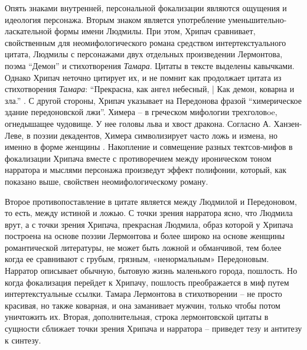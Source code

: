 \documentclass[12pt,a4paper]{article}
\begin{document}
Опять знаками внутренней, персональной фокализации являются ощущения и идеология персонажа. Вторым знаком является употребление уменьшительно-ласкательной формы имени Людмилы.  При этом, Хрипач сравнивает, свойственным для неомифологического романа средством интертекстуального цитата, Людмилы с персонажами двух отдельных произведении Лермонтова, поэма \enquote{Демон} и стихотворения \emph{Тамара}. Цитаты в тексте выделены кавычками. Однако Хрипач неточно цитирует их, и не помнит как продолжает цитата из стихотворения \emph{Тамара}: \enquote{Прекрасна, как ангел небесный, | Как демон, коварна и зла.} \parencite[194]{lermontov2000}. С другой стороны, Хрипач указывает на Передонова фразой \enquote{химерическое здание передоновской лжи}. Химера – в греческом мифологии трехголовoe, огнедышащее чудовище. У нее головы льва и хвост дракона. Согласно А. Ханзен-Леве, в поэзии декадентов, Химера символизирует часто ложь и измена, но именно в форме женщины \parencite[200]{hansen-love1999}. Накопление и совмещение разных тектсов-мифов в фокализации Хрипача вместе с противоречием между ироническом тоном нарратора и мыслями персонажа произведут эффект полифонии, который, как показано выше, свойствен неомифологическому роману.

Второе противопоставление в цитате является между Людмилой и Передоновом, то есть, между истиной и ложью. С точки зрения нарратора ясно, что Людмила врут, а с точки зрения Хрипача, прекрасная Людмила, образ которой у Хрипача построена на основе поэзии Лермонтова и более широко на основе женщины романтической литературы, не может быть ложной и обманчивой, тем более когда ее сравнивают с грубым, грязным, «ненормальным» Передоновым. Нарратор описывает обычную, бытовую жизнь маленького города, пошлость. Но когда фокализация перейдет к Хрипачу, пошлость преображается в миф путем интертекстуальные ссылки. Тамара Лермонтова в стихотворении – не просто красивая, но также коварная, и она заманивает мужчин, только чтобы потом уничтожить их. Вторая, дополнительная, строка лермонтовской цитаты в сущности сближает точки зрения Хрипача и нарратора – приведет тезу и антитезу к синтезу.  



\end{document}
